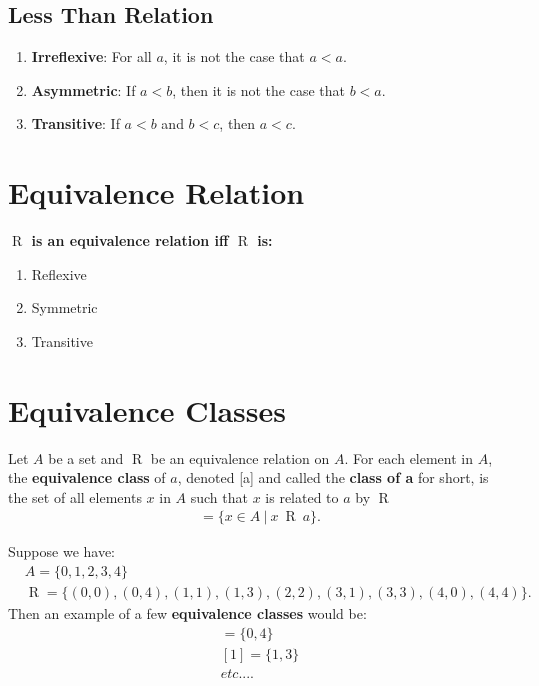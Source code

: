 \documentclass{report}
\begin{document}
    \subsection{Less Than Relation}
    \begin{enumerate}
        \item \textbf{Irreflexive}: For all \(a\), it is not the case that \(a < a\).
        \item \textbf{Asymmetric}: If \(a < b\), then it is not the case that \(b < a\).
        \item \textbf{Transitive}: If \(a < b\) and \(b < c\), then \(a < c\).
    \end{enumerate}

    \pagebreak \bigbreak \noindent 
    \section{\LARGE Equivalence Relation}
    \smallbreak \noindent
    \begin{definition}
        \textbf{$\mathrel{R}$ is an \textbf{equivalence} relation iff $\mathrel{R}$ is:}  
        \begin{enumerate}
            \item Reflexive
            \item Symmetric
            \item Transitive
        \end{enumerate}
    \end{definition}

    \pagebreak \bigbreak \noindent 
    \section{\LARGE Equivalence Classes}
    \smallbreak \noindent
    \begin{definition}
       Let $A$ be a set and $\mathrel{R}$ be an equivalence relation on $A$. For each element in $A$, the \textbf{equivalence class} of $a$, denoted [a] and called the \textbf{class of a} for short, is the set of all elements $x$ in $A$ such that $x$ is related to $a$ by $\mathrel{R}$
        \begin{align*}
            [a] = \{x \in A\ |\ x\ \mathrel{R}\ a\}
        .\end{align*}
    \end{definition}
    \bigbreak \noindent 
    Suppose we have:
    \begin{align*}
        &A = \{0,1,2,3,4\} \\ &\mathrel{R} = \{(0,0),(0,4),(1,1),(1,3),(2,2),(3,1),(3,3),(4,0),(4,4)\}
    .\end{align*}
    \bigbreak \noindent 
    Then an example of a few \textbf{equivalence classes} would be:
    \begin{align*}
        [0] = \{0,4\} \\
        [1] = \{1,3\} \\
        etc...
    .\end{align*}
\end{document}
